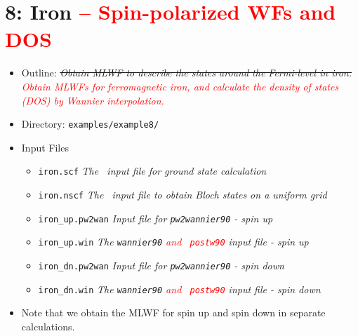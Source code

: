 \documentclass[a4paper,11pt,twoside]{article}
\def\tent#1{\textcolor{red}{#1}}     %
\begin{document}
\cleardoublepage

\section*{8: Iron \tent{-- Spin-polarized WFs and DOS}}
\begin{itemize}
\item{Outline: \it{\sout{Obtain MLWF to describe the states around the
        Fermi-level in iron.} \tent{Obtain MLWFs for ferromagnetic
        iron, and calculate the density of states (DOS) by Wannier
        interpolation.}}}
\item{Directory: {\tt examples/example8/}}
\item{Input Files}
\begin{itemize}
\item{ {\tt iron.scf}  {\it The \pwscf\ input file for ground state
    calculation}} 
\item{ {\tt iron.nscf}  {\it The \pwscf\ input file to obtain Bloch states
    on a uniform grid}} 
\item{ {\tt iron\_up.pw2wan}  {\it Input file for {\tt pw2wannier90} -
    spin up}} 
\item{ {\tt iron\_up.win} {\it The {\tt wannier90} \tent{and {\tt
          postw90}} input file - spin up}}
\item{ {\tt iron\_dn.pw2wan}  {\it Input file for {\tt pw2wannier90} -
    spin down}} 
\item{ {\tt iron\_dn.win}  {\it The {\tt wannier90} \tent{and {\tt
          postw90}} input file - spin down}}
\end{itemize}
\item{Note that we obtain the MLWF for spin up and spin down in
  separate calculations.} 
\end{itemize}
\end{document}
